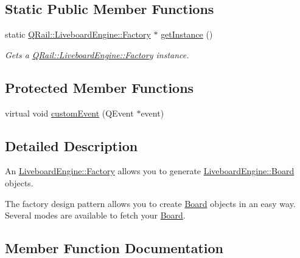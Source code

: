 \subsection*{Static Public Member Functions}
\begin{DoxyCompactItemize}
\item 
static \mbox{\hyperlink{classQRail_1_1LiveboardEngine_1_1Factory}{Q\+Rail\+::\+Liveboard\+Engine\+::\+Factory}} $\ast$ \mbox{\hyperlink{classQRail_1_1LiveboardEngine_1_1Factory_a08e37a6538aad6341edf7066f10a63c7}{get\+Instance}} ()
\begin{DoxyCompactList}\small\item\em Gets a \mbox{\hyperlink{classQRail_1_1LiveboardEngine_1_1Factory}{Q\+Rail\+::\+Liveboard\+Engine\+::\+Factory}} instance. \end{DoxyCompactList}\end{DoxyCompactItemize}
\subsection*{Protected Member Functions}
\begin{DoxyCompactItemize}
\item 
virtual void \mbox{\hyperlink{classQRail_1_1LiveboardEngine_1_1Factory_a214c37703d996797de42151ec41f55b2}{custom\+Event}} (Q\+Event $\ast$event)
\end{DoxyCompactItemize}


\subsection{Detailed Description}
An \mbox{\hyperlink{classQRail_1_1LiveboardEngine_1_1Factory}{Liveboard\+Engine\+::\+Factory}} allows you to generate \mbox{\hyperlink{classQRail_1_1LiveboardEngine_1_1Board}{Liveboard\+Engine\+::\+Board}} objects. 

The factory design pattern allows you to create \mbox{\hyperlink{classQRail_1_1LiveboardEngine_1_1Board}{Board}} objects in an easy way. Several modes are available to fetch your \mbox{\hyperlink{classQRail_1_1LiveboardEngine_1_1Board}{Board}}. 

\subsection{Member Function Documentation}
\mbox{\label{classQRail_1_1LiveboardEngine_1_1Factory_a5a581cb60c12dea0af977ea08c64e0c8}} 
